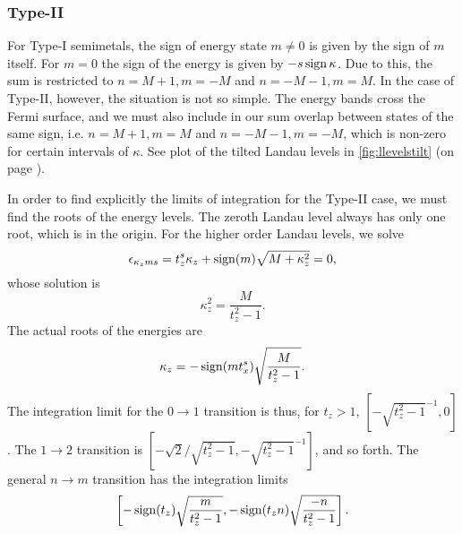 \subsubsection{Type-II}
For Type-I semimetals, the sign of energy state \( m \neq 0 \) is given by the sign of \( m \) itself.
For \( m = 0 \) the sign of the energy is given by \( -s \operatorname{sign}{\kappa } \).
Due to this, the sum is restricted to \( n=M+1, m=-M \) and \( n=-M-1, m=M \).
In the case of Type-II, however, the situation is not so simple.
The energy bands cross the Fermi surface, and we must also include in our sum overlap between states of the same sign, i.e. \( n=M+1, m=M \) and \( n=-M-1, m=-M \), which is non-zero for certain intervals of \( \kappa  \).
See plot of the tilted Landau levels in \cref{fig:llevelstilt} (on page \pageref{fig:llevelstilt}).


In order to find explicitly the limits of integration for the Type-II case, we must find the roots of the energy levels.
The zeroth Landau level always has only one root, which is in the origin.
For the higher order Landau levels, we solve
\begin{equation}
  \label{eq:127}
  \epsilon_{\kappa_z m s } = t_z^s \kappa_z + \operatorname{sign}(m) \sqrt{M + \kappa_{z} ^2} = 0,
\end{equation}
whose solution is
\[
\kappa_z^2 = \frac{M}{t_{z}^2 - 1}.
\]
The actual roots of the energies are
\begin{equation}
  \label{eq:128}
  \kappa_z = -\operatorname{sign}(m t^s_x) \sqrt{\frac{M}{t_{z}^2 - 1}}.
\end{equation}
The integration limit for the \( 0 \to 1 \) transition is thus, for \( t_z > 1 \), \( [-\sqrt{t_z^2 - 1 }^{-1}, 0] \).
The \( 1\to 2 \) transition is \( [-\sqrt{2} /\sqrt{t_z^2 - 1}, -\sqrt{t_z^2 - 1 }^{-1}] \), and so forth.
The general \( n \to m \) transition has the integration limits
\[
  \left[-\operatorname{sign}(t_z) \sqrt{\frac{m}{t_{z}^2 - 1}}, -\operatorname{sign}(t_z n) \sqrt{\frac{-n}{t_{z}^2 -1}} \right].
\]

